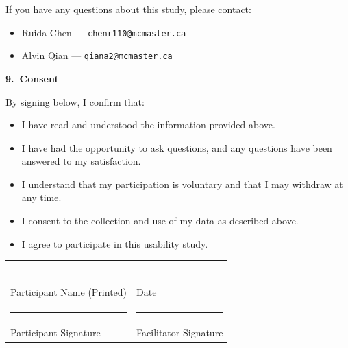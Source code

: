 \documentclass[12pt, titlepage]{article}
\begin{document}
If you have any questions about this study, please contact:
\begin{itemize}
  \item Ruida Chen --- \texttt{chenr110@mcmaster.ca}
  \item Alvin Qian --- \texttt{qiana2@mcmaster.ca}
\end{itemize}

\bigskip

\noindent\textbf{9.\ Consent}

By signing below, I confirm that:
\begin{itemize}
  \item I have read and understood the information provided above.
  \item I have had the opportunity to ask questions, and any questions have been answered to my satisfaction.
  \item I understand that my participation is voluntary and that I may withdraw at any time.
  \item I consent to the collection and use of my data as described above.
  \item I agree to participate in this usability study.
\end{itemize}

\bigskip

\noindent
\begin{tabularx}{\textwidth}{X X}
\rule{0.45\textwidth}{0.4pt} & \rule{0.45\textwidth}{0.4pt} \\
Participant Name (Printed) & Date \\[24pt]
\rule{0.45\textwidth}{0.4pt} & \rule{0.45\textwidth}{0.4pt} \\
Participant Signature & Facilitator Signature \\
\end{tabularx}
\end{document}
